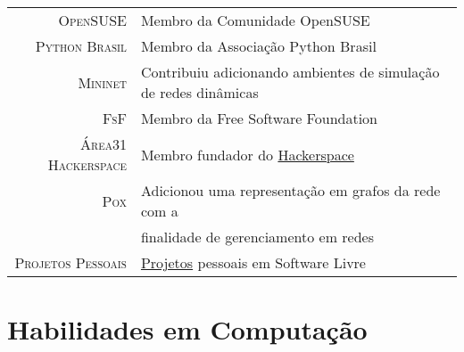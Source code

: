 \documentclass[a4paper,10pt]{article} %
\begin{document}
\begin{tabular}{rl}
\textsc{OpenSUSE}  & Membro da Comunidade OpenSUSE \\
\textsc{Python Brasil}  & Membro da Associação Python Brasil \\
\textsc{Mininet}  & Contribuiu adicionando ambientes de simulação de redes
dinâmicas \\
\textsc{FsF} & Membro da Free Software Foundation \\
\textsc{Área31 Hackerspace} & Membro fundador do
\href{http://area31.net.br}{Hackerspace} \\
\textsc{Pox} & Adicionou uma representação em grafos da rede com a
\\ & finalidade de gerenciamento em redes \\
\textsc{Projetos Pessoais} & \href{http://github.com/pantuza}{Projetos}
pessoais em Software Livre \\
\end{tabular}













\section{Habilidades em Computação}
\end{document}
